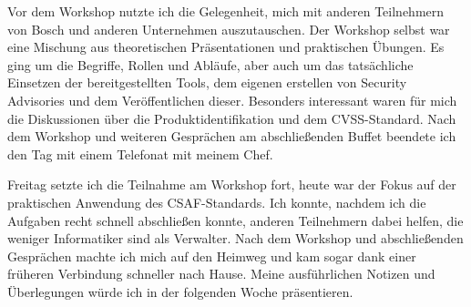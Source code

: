 Vor dem Workshop nutzte ich die Gelegenheit, mich mit anderen Teilnehmern von Bosch und anderen Unternehmen auszutauschen.
Der Workshop selbst war eine Mischung aus theoretischen Präsentationen und praktischen Übungen.
Es ging um die Begriffe, Rollen und Abläufe, aber auch um das tatsächliche Einsetzen der bereitgestellten Tools, dem eigenen erstellen von Security Advisories und dem Veröffentlichen dieser.
Besonders interessant waren für mich die Diskussionen über die Produktidentifikation und dem CVSS-Standard.
Nach dem Workshop und weiteren Gesprächen am abschließenden Buffet beendete ich den Tag mit einem Telefonat mit meinem Chef.

\sweekdaymarginpar{\weekdayFridayLong}

Freitag setzte ich die Teilnahme am Workshop fort, heute war der Fokus auf der praktischen Anwendung des CSAF-Standards.
Ich konnte, nachdem ich die Aufgaben recht schnell abschließen konnte, anderen Teilnehmern dabei helfen, die weniger Informatiker sind als Verwalter.
Nach dem Workshop und abschließenden Gesprächen machte ich mich auf den Heimweg und kam sogar dank einer früheren Verbindung schneller nach Hause.
Meine ausführlichen Notizen und Überlegungen würde ich in der folgenden Woche präsentieren.
